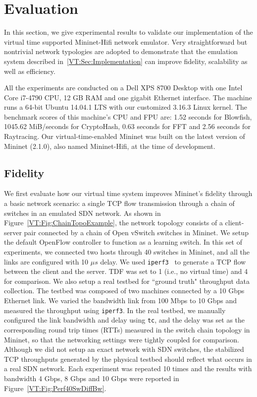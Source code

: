\section{Evaluation}
\label{VT:Sec:Experiments}

In this section, we give experimental results to validate our implementation of the virtual time supported Mininet-Hifi network emulator.
Very straightforward but nontrivial network typologies are adopted to demonstrate
that the emulation system described in~\ref{VT:Sec:Implementation} can improve fidelity, scalability as well as efficiency. 

All the experiments are conducted on a Dell XPS 8700 Desktop with one Intel Core i7-4790 CPU,
12 GB RAM and one gigabit Ethernet interface. The machine runs a 64-bit Ubuntu 14.04.1 LTS with our customized 3.16.3 Linux kernel.
The benchmark scores of this machine's CPU and FPU are: 1.52 seconds for Blowfish, 1045.62 MiB/seconds for CryptoHash,
0.63 seconds for FFT and 2.56 seconds for Raytracing. Our virtual-time-enabled Mininet was built on the latest version of Mininet (2.1.0),
also named Mininet-Hifi, at the time of development.

\subsection{Fidelity}
We first evaluate how our virtual time system improves Mininet's fidelity through a basic network scenario:
a single TCP flow transmission through a chain of switches in an emulated SDN network.
As shown in Figure~\ref{VT:Fig:ChainTopoExample}, the network topology consists of a client-server pair connected by a chain of Open vSwitch switches in Mininet.
We setup the default OpenFlow controller to function as a learning switch.
In this set of experiments, we connected two hosts through 40 switches in Mininet, and all the links are configured with 10 $\mu s$ delay.
We used \texttt{iperf3}~\cite{iperf3} to generate a TCP flow between the client and the server.
TDF was set to 1 (i.e., no virtual time) and 4 for comparison. We also setup a real testbed for ``ground truth" throughput data collection.
The testbed was composed of two machines connected by a 10 Gbps Ethernet link.
We varied the bandwidth link from 100 Mbps to 10 Gbps and measured the throughput using \texttt{iperf3}.
In the real testbed, we manually configured the link bandwidth and delay using \texttt{tc},
and the delay was set as the corresponding round trip times (RTTs) measured in the switch chain topology in Mininet,
so that the networking settings were tightly coupled for comparison.
Although we did not setup an exact network with SDN switches,
the stabilized TCP throughputs generated by the physical testbed should reflect what occurs in a real SDN network.
Each experiment was repeated 10 times and the results with bandwidth 4 Gbps, 8 Gbps and 10 Gbps were reported in Figure~\ref{VT:Fig:Perf40SwDiffBw}. 

